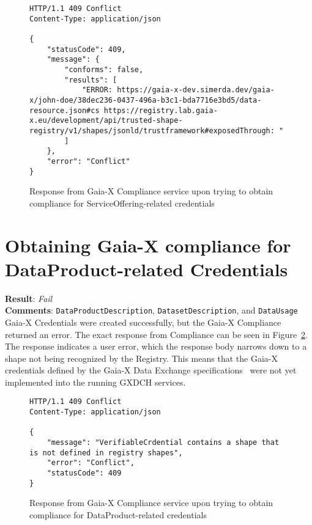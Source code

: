 \begin{figure}[h]
    \centering
    \begin{verbatim}
HTTP/1.1 409 Conflict
Content-Type: application/json

{
	"statusCode": 409,
	"message": {
		"conforms": false,
		"results": [
			"ERROR: https://gaia-x-dev.simerda.dev/gaia-x/john-doe/38dec236-0437-496a-b3c1-bda7716e3bd5/data-resource.json#cs https://registry.lab.gaia-x.eu/development/api/trusted-shape-registry/v1/shapes/jsonld/trustframework#exposedThrough: "
		]
	},
	"error": "Conflict"
}
    \end{verbatim}
    \caption{Response from Gaia-X Compliance service upon trying to obtain compliance for ServiceOffering-related credentials}\label{fig:service_offering_compliance_response}
\end{figure}

\section{Obtaining Gaia-X compliance for DataProduct-related Credentials}\label{sec:obtaining-gaia-x-compliance-for-dataproduct-related-credentials}

\textbf{Result}: \textit{Fail}
\\
\textbf{Comments}: \texttt{DataProductDescription}, \texttt{DatasetDescription}, and \texttt{DataUsage} Gaia-X Credentials were created successfully, but the Gaia-X Compliance returned an error.
The exact response from Compliance can be seen in Figure~\ref{fig:data_product_compliance_response}.
The response indicates a user error, which the response body narrows down to a shape not being recognized by the Registry.
This means that the Gaia-X credentials defined by the Gaia-X Data Exchange specifications~\cite{gaiax_data_exchange_document} were not yet implemented into the running GXDCH services.

\begin{figure}[h]
	\centering
	\begin{verbatim}
HTTP/1.1 409 Conflict
Content-Type: application/json

{
	"message": "VerifiableCrdential contains a shape that is not defined in registry shapes",
	"error": "Conflict",
	"statusCode": 409
}
	\end{verbatim}
	\caption{Response from Gaia-X Compliance service upon trying to obtain compliance for DataProduct-related credentials}\label{fig:data_product_compliance_response}
\end{figure}

